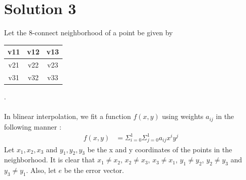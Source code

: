 \documentclass[a4paper,fleqn,11pt]{article}
\theoremstyle{mytheor}
\begin{document}
\section*{Solution 3}
Let the 8-connect neighborhood of a point be given by
\begin{tabular}{| c | c | c |}
	\hline
	v11	& v12 & v13 \\
	\hline
	v21 & v22 & v23 \\
	\hline
	v31 & v32 & v33 \\
	\hline
\end{tabular}. \\ \\
In blinear interpolation, we fit a function $f(x, y)$ using weights $a_{ij}$ in the following manner :
\begin{align}
f(x, y) & = \Sigma_{i = 0}^1\Sigma_{j = 0}^1 a_{ij}x^i y^j
\end{align}
Let $x_1, x_2, x_3$ and $y_1, y_2, y_3$ be the x and y coordinates of the points in the neighborhood. It is clear that $x_1 \neq x_2$, $x_2 \neq x_3$, $x_3 \neq x_1$, $y_1 \neq y_2$, $y_2 \neq y_3$ and $y_3 \neq y_1$. Also, let $e$ be the error vector.
\end{document}
